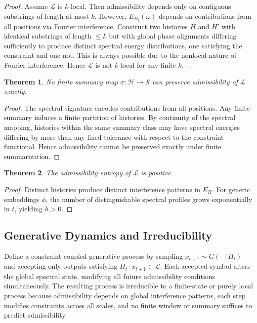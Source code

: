 \documentclass[12pt, a4paper]{article}
\theoremstyle{plain}
\newtheorem{theorem}{Theorem}[section]
\theoremstyle{definition}
\theoremstyle{remark}
\begin{document}
\begin{proof}
Assume $\mathcal{L}$ is $k$-local. Then admissibility depends only on contiguous substrings of length at most $k$. However, $E_{H_t}(\omega)$ depends on contributions from all positions via Fourier interference. Construct two histories $H$ and $H'$ with identical substrings of length $\le k$ but with global phase alignments differing sufficiently to produce distinct spectral energy distributions, one satisfying the constraint and one not. This is always possible due to the nonlocal nature of Fourier interference. Hence $\mathcal{L}$ is not $k$-local for any finite $k$.
\end{proof}

\begin{theorem}
No finite summary map $\sigma : \mathcal{H} \to \mathcal{S}$ can preserve admissibility of $\mathcal{L}$ exactly.
\end{theorem}

\begin{proof}
The spectral signature encodes contributions from all positions. Any finite summary induces a finite partition of histories. By continuity of the spectral mapping, histories within the same summary class may have spectral energies differing by more than any fixed tolerance with respect to the constraint functional. Hence admissibility cannot be preserved exactly under finite summarization.
\end{proof}

\begin{theorem}
The admissibility entropy of $\mathcal{L}$ is positive.
\end{theorem}

\begin{proof}
Distinct histories produce distinct interference patterns in $E_H$. For generic embeddings $\phi$, the number of distinguishable spectral profiles grows exponentially in $t$, yielding $h > 0$.
\end{proof}

\subsection{Generative Dynamics and Irreducibility}

Define a constraint-coupled generative process by sampling $x_{t+1} \sim G(\cdot \mid H_t)$ and accepting only outputs satisfying $H_t \cdot x_{t+1} \in \mathcal{L}$. Each accepted symbol alters the global spectral state, modifying all future admissibility conditions simultaneously. The resulting process is irreducible to a finite-state or purely local process because admissibility depends on global interference patterns, each step modifies constraints across all scales, and no finite window or summary suffices to predict admissibility.
\end{document}
